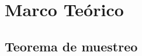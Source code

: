 \chapter{Marco Teórico}\label{sec:Marco_Teorico}
\thispagestyle{empty}

\begingroup
{}
\small

\endgroup

\section{Teorema de muestreo}
